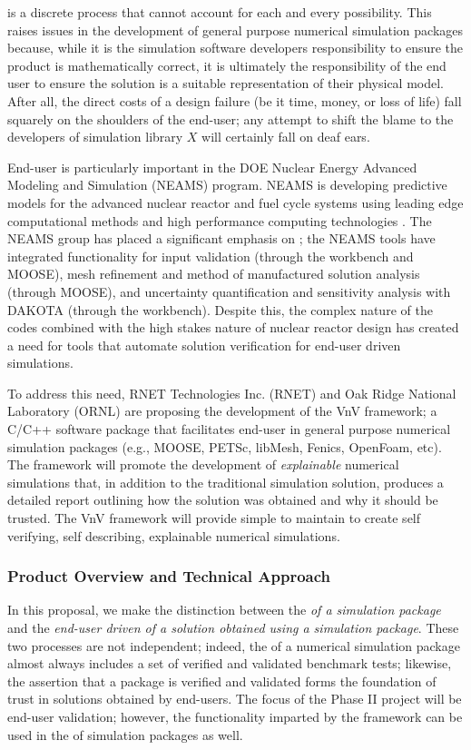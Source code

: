 \VV is a discrete process that cannot account for each and every possibility. This raises issues in the development of general purpose numerical simulation packages because, while it is the simulation software developers responsibility to ensure the product is mathematically correct, it is ultimately the responsibility of the end user to ensure the solution is a suitable representation of their physical model. After all, the direct costs of a design failure (be it time, money, or loss of life) fall squarely on the shoulders of the end-user; any attempt to shift the blame to the developers of simulation library $X$ will certainly fall on deaf ears. 

End-user \VV is particularly important in the DOE Nuclear Energy Advanced Modeling and Simulation (NEAMS) program. NEAMS is developing predictive models for the advanced nuclear reactor and fuel cycle systems using leading edge computational methods and high performance computing technologies \cite{NEAMS}. The NEAMS group has placed a significant emphasis on \VV \cite{NEAMSVV}; the NEAMS tools have integrated functionality for input validation (through the workbench and MOOSE), mesh refinement and method of manufactured solution analysis (through MOOSE), and uncertainty quantification and sensitivity analysis with DAKOTA (through the workbench). Despite this, the complex nature of the codes combined with the high stakes nature of nuclear reactor design has created a need for tools that automate solution verification for end-user driven simulations. 

To address this need, RNET Technologies Inc. (RNET) and Oak Ridge National Laboratory (ORNL) are proposing the development of the VnV framework; a C/C++ software package that facilitates end-user \VV in general purpose numerical simulation packages (e.g., MOOSE, PETSc, libMesh, Fenics, OpenFoam, etc). The framework will promote the development of \emph{explainable} numerical simulations that, in addition to the traditional simulation solution, produces a detailed report outlining how the solution was obtained and why it should be trusted. The VnV framework will provide simple to maintain \VV to create self verifying, self describing, explainable numerical simulations. 

\subsubsection{Product Overview and Technical Approach}

In this proposal, we make the distinction between the \emph{\VV of a simulation package} and the \emph{end-user driven \VV of a solution obtained using a simulation package}. These two processes are not independent; indeed, the \VV of a numerical simulation 
package almost always includes a set of verified and validated benchmark tests; likewise, the assertion that a package is verified and validated forms the foundation of trust in solutions obtained by end-users. The focus of the Phase II project will be end-user validation; however,  the functionality imparted by the framework can be used in the \VV of simulation packages as well. 

